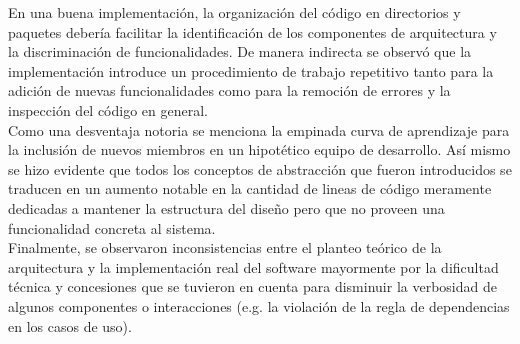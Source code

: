 En una buena implementación, la organización del código en directorios y paquetes debería facilitar la identificación de los componentes de arquitectura y la discriminación de funcionalidades.   
De manera indirecta se observó que la implementación introduce un procedimiento de trabajo repetitivo tanto para la adición de nuevas funcionalidades como para la remoción de errores y la inspección del código en general.\\
Como una desventaja notoria se menciona la empinada curva de aprendizaje para la inclusión de nuevos miembros en un hipotético equipo de desarrollo. Así mismo se hizo evidente que todos los conceptos de abstracción que fueron introducidos se traducen en un aumento notable en la cantidad de lineas de código meramente dedicadas a mantener la estructura del diseño pero que no proveen una funcionalidad concreta al sistema.\\
Finalmente, se observaron inconsistencias entre el planteo teórico de la arquitectura y la implementación real del software mayormente por la dificultad técnica y concesiones que se tuvieron en cuenta para disminuir la verbosidad de algunos componentes o interacciones (e.g. la violación de la regla de dependencias en los casos de uso).